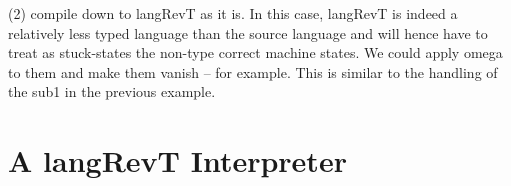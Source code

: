 \documentclass{llncs}
\begin{document}
(2) compile down to {{langRevT}} as it is. In this case, {{langRevT}}
is indeed a relatively less typed language than the source language
and will hence have to treat as stuck-states the non-type correct
machine states. We could apply omega to them and make them vanish --
for example. This is similar to the handling of the {{sub1}} in the
previous example. 


\section{A {{langRevT}} Interpreter}

%


\end{document}
